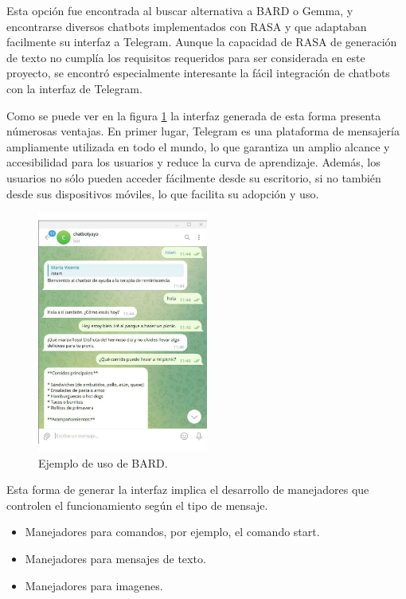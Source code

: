 Esta opción fue encontrada al buscar alternativa a BARD o Gemma, y encontrarse diversos chatbots implementados con RASA y que adaptaban facilmente su interfaz a Telegram. Aunque la capacidad de RASA de generación de texto no cumplía los requisitos requeridos para ser considerada en este proyecto, se encontró especialmente interesante la fácil integración de chatbots con la interfaz de Telegram. 

Como se puede ver en la figura \ref{fig:ejemploRASATELEGRAM} la interfaz generada de esta forma presenta númerosas ventajas. En primer lugar, Telegram es una plataforma de mensajería ampliamente utilizada en todo el mundo, lo que garantiza un amplio alcance y accesibilidad para los usuarios y reduce la curva de aprendizaje. Además, los usuarios no sólo pueden acceder fácilmente desde su escritorio, si no también desde sus dispositivos móviles, lo que facilita su adopción y uso.

\begin{figure}
	\centering
	\includegraphics[width=0.5\textwidth]{Imagenes/telegram1}
	\caption{ Ejemplo de uso de BARD.}
	\label{fig:ejemploRASATELEGRAM}
\end{figure}

Esta forma de generar la interfaz implica el desarrollo de manejadores que controlen el funcionamiento según el tipo de mensaje. 

\begin{itemize}
	\item Manejadores para comandos, por ejemplo, el comando start.
	
	\item Manejadores para mensajes de texto.
	
	\item Manejadores para imagenes. 
\end{itemize}

